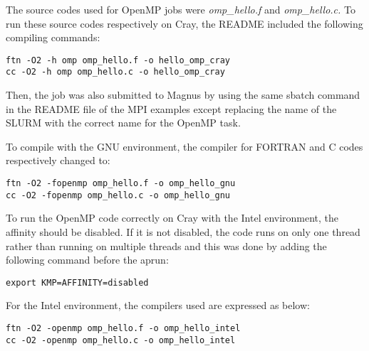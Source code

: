 The source codes used for OpenMP jobs were \emph{omp\_hello.f} and \emph{omp\_hello.c.} To run these source codes respectively on Cray, the README included the 
following compiling commands:

\begin{tcolorbox}
\begin{Verbatim}[fontsize=\scriptsize]
ftn -O2 -h omp omp_hello.f -o hello_omp_cray
cc -O2 -h omp omp_hello.c -o hello_omp_cray
\end{Verbatim}
\end{tcolorbox}

Then, the job was also submitted to Magnus by using the same sbatch command in the README file of the MPI examples except replacing the name of the SLURM
with the correct name for the OpenMP task.

To compile with the GNU environment, the compiler for FORTRAN and C codes respectively changed to: 

\begin{tcolorbox}
\begin{Verbatim}[fontsize=\scriptsize]
ftn -O2 -fopenmp omp_hello.f -o omp_hello_gnu
cc -O2 -fopenmp omp_hello.c -o omp_hello_gnu
\end{Verbatim}
\end{tcolorbox}

To run the OpenMP code correctly on Cray with the Intel environment, the affinity should be disabled. If it is not disabled, the code runs on only one
thread rather than running on multiple threads and this was done by adding the following command before the aprun:

\begin{tcolorbox}
\begin{Verbatim}[fontsize=\scriptsize]
export KMP=AFFINITY=disabled
\end{Verbatim}
\end{tcolorbox}

For the Intel environment, the compilers used are expressed as below:

\begin{tcolorbox}
\begin{Verbatim}[fontsize=\scriptsize]
ftn -O2 -openmp omp_hello.f -o omp_hello_intel
cc -O2 -openmp omp_hello.c -o omp_hello_intel
\end{Verbatim}
\end{tcolorbox}

